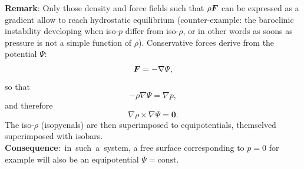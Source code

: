 \textbf{Remark}: Only those density and force fields such that $\rho \bF$ can be expressed as a gradient allow to reach hydrostatic equilibrium (counter-example: the baroclinic instability developing when iso-$p$ differ from iso-$\rho$, or in other words as soons as pressure is not a simple function of $\rho$).
 Conservative forces derive from the potential $\Psi$:
\begin{equation}
\bF = - \nabla \Psi,
\end{equation}
so that
\begin{equation}
-\rho \nabla \Psi = \nabla p,
\end{equation}
and therefore 
\begin{equation}
\nabla \rho \times \nabla \Psi = \boldsymbol 0.
\end{equation}
The iso-$\rho$ (isopycnals) are then superimposed to equipotentials, themselved superimposed with isobars. \\
\textbf{Consequence}:~in~such~a~system, a free surface corresponding to  $p = 0$ for example will also be an equipotential $\Psi = \text{const}$.

